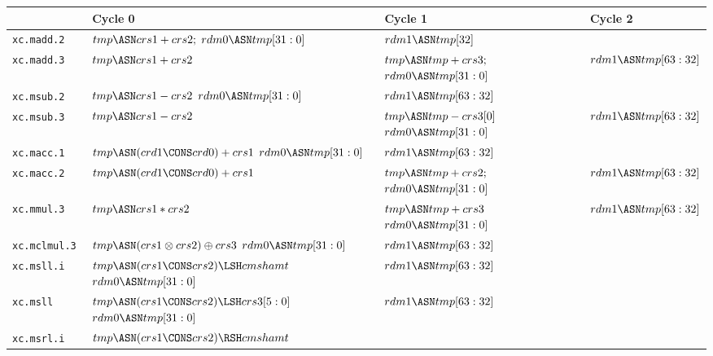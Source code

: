 \documentclass{article}
\begin{document}
\begin{table}[H]
\begin{tabularx}{\textwidth}{l Y Y Y }
\toprule
\textbf{}& \textbf{Cycle 0}& \textbf{Cycle 1}& \textbf{Cycle 2} \\
\midrule
{\tt xc.madd.2 }&
    $tmp \ASN crs1+crs2;$\newline 
    $rdm0\ASN tmp[31:0]$ 
 &  $rdm1\ASN tmp[32]$ 
 & \\
{\tt xc.madd.3 }&
   $tmp \ASN crs1 + crs2$
 & $tmp \ASN tmp + crs3;$\newline
   $rdm0\ASN tmp[31:0]$ 
 & $rdm1\ASN tmp[63:32]$ 
\\
{\tt xc.msub.2 }&
   $tmp \ASN crs1 - crs2$ \newline
   $rdm0\ASN tmp[31:0]$ 
 & $rdm1\ASN tmp[63:32]$ 
 &
\\
{\tt xc.msub.3 }&
   $tmp \ASN crs1 - crs2$ \newline
 &
   $tmp \ASN tmp - crs3[0]$ \newline
   $rdm0\ASN tmp[31:0]$ 
 & $rdm1\ASN tmp[63:32]$ 
\\
{\tt xc.macc.1 }&
    $tmp \ASN (crd1 \CONS crd0) + crs1$\newline 
    $rdm0\ASN tmp[31:0]$ 
 &  $rdm1\ASN tmp[63:32]$ 
 &
\\
{\tt xc.macc.2 }&
    $tmp \ASN (crd1 \CONS crd0) + crs1$\newline 
 &  $tmp \ASN tmp + crs2;$\newline 
    $rdm0\ASN tmp[31:0]$ 
 &  $rdm1\ASN tmp[63:32]$ 
\\
{\tt xc.mmul.3 }&
    $tmp \ASN crs1 * crs2$ \newline 
 &  
    $tmp \ASN tmp + crs3$\newline 
    $rdm0\ASN tmp[31:0]$ 
 &  $rdm1\ASN tmp[63:32]$ 
\\
{\tt xc.mclmul.3 }&
    $tmp \ASN (crs1 \otimes crs2) \oplus crs3$\newline 
    $rdm0\ASN tmp[31:0]$ 
 &  $rdm1\ASN tmp[63:32]$ 
 &  
\\
{\tt xc.msll.i }&
    $tmp \ASN (crs1 \CONS crs2) \LSH cmshamt$\newline 
    $rdm0\ASN tmp[31:0]$ 
 &  $rdm1\ASN tmp[63:32]$ 
 &
\\
{\tt xc.msll }&
    $tmp \ASN (crs1 \CONS crs2) \LSH crs3[5:0]$\newline 
    $rdm0\ASN tmp[31:0]$ 
 &  $rdm1\ASN tmp[63:32]$ 
 &
\\
{\tt xc.msrl.i }&
    $tmp \ASN (crs1 \CONS crs2) \RSH cmshamt$\newline 

\end{tabularx}
\end{table}
\end{document}
